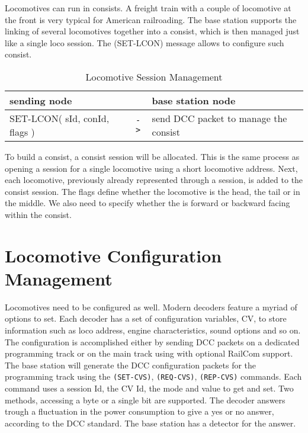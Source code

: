 Locomotives can run in consists. A freight train with a couple of locomotive at the front is very typical for American railroading. The base station supports the linking of several locomotives together into a consist, which is then managed just like a single loco session. The (SET-LCON) message allows to configure such consist.

\begin{table}[ht!]
    \begin{center}
        \caption{Locomotive Session Management}
        \begin{tabular}{|p{}| c |p{}|}
            \toprule
            \textbf{sending node} & & \textbf{ base station node} \\
            \midrule
            SET-LCON( sId, conId, flags ) & \texttt{->} & send DCC packet to manage the consist  \\
            \bottomrule
        \end{tabular}
    \end{center}
\end{table}

To build a consist, a consist session will be allocated. This is the same process as opening a session for a single locomotive using a short locomotive address. Next, each locomotive, previously already represented through a session, is added to the consist session. The flags define whether the locomotive is the head, the tail or in the middle. We also need to specify whether the is forward or backward facing within the consist.

\section{Locomotive Configuration Management}

Locomotives need to be configured as well. Modern decoders feature a myriad of options to set. Each decoder has a set of configuration variables, CV, to store information such as loco address, engine characteristics, sound options and so on. The configuration is accomplished either by sending DCC packets on a dedicated programming track or on the main track using with optional RailCom support. The base station will generate the DCC configuration packets for the programming track using the \texttt{(SET-CVS)}, \texttt{(REQ-CVS)}, \texttt{(REP-CVS)} commands. Each command uses a session Id, the CV Id, the mode and value to get and set. Two methods, accessing a byte or a single bit are supported. The decoder answers trough a fluctuation in the power consumption to give a yes or no answer, according to the DCC standard. The base station has a detector for the answer.

